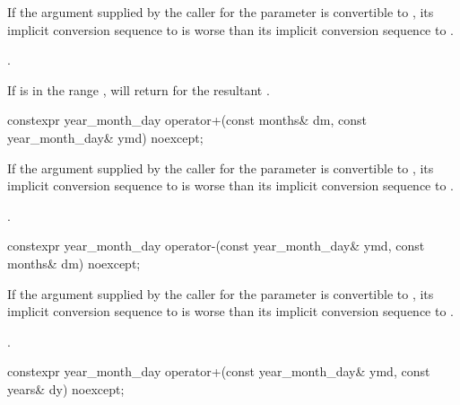 \begin{itemdescr}
\pnum
\constraints
If the argument supplied by the caller for the  parameter
is convertible to ,
its implicit conversion sequence to 
is worse than its implicit conversion sequence to
.

\pnum
\returns
{}.

\pnum
\begin{note}
If  is in the range ,
 will return  for
the resultant .
\end{note}
\end{itemdescr}

%
\begin{itemdecl}
constexpr year_month_day operator+(const months& dm, const year_month_day& ymd) noexcept;
\end{itemdecl}

\begin{itemdescr}
\pnum
\constraints
If the argument supplied by the caller for the  parameter
is convertible to ,
its implicit conversion sequence to 
is worse than its implicit conversion sequence to
.

\pnum
\returns
{}.
\end{itemdescr}

%
\begin{itemdecl}
constexpr year_month_day operator-(const year_month_day& ymd, const months& dm) noexcept;
\end{itemdecl}

\begin{itemdescr}
\pnum
\constraints
If the argument supplied by the caller for the  parameter
is convertible to ,
its implicit conversion sequence to 
is worse than its implicit conversion sequence to
.

\pnum
\returns
{}.
\end{itemdescr}

%
\begin{itemdecl}
constexpr year_month_day operator+(const year_month_day& ymd, const years& dy) noexcept;
\end{itemdecl}

